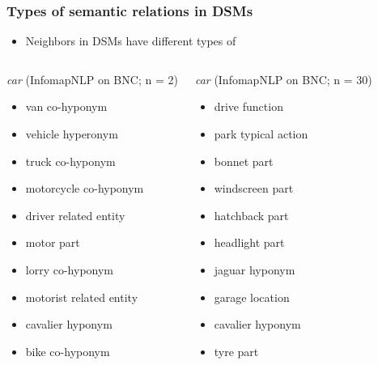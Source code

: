 \begin{frame}
\frametitle{Types of semantic relations in DSMs}

\begin{itemize}
\item Neighbors in DSMs have different types of
\end{itemize}

\ungap[1.5]\footnotesize
 \begin{columns}[t]
    \begin{block}{\emph{car} {\small (InfomapNLP on BNC; n = 2)}}
      \begin{itemize}
      \item  van {\color{counterpoint} co-hyponym}
      \item vehicle {\color{counterpoint} hyperonym}
      \item truck {\color{counterpoint} co-hyponym}
      \item motorcycle {\color{counterpoint} co-hyponym}
      \item driver {\color{counterpoint} related entity}
      \item motor {\color{counterpoint} part}
      \item lorry {\color{counterpoint} co-hyponym}
      \item motorist {\color{counterpoint} related entity}
      \item cavalier {\color{counterpoint} hyponym}
      \item bike {\color{counterpoint} co-hyponym}
\end{itemize}
\end{block}
\begin{block} {\emph{car} {\small (InfomapNLP on BNC; n = 30)}}
  \begin{itemize}
  \item drive {\color{counterpoint} function}
  \item park {\color{counterpoint} typical action}
  \item bonnet {\color{counterpoint} part}
  \item windscreen {\color{counterpoint} part}
  \item hatchback {\color{counterpoint} part}
\item headlight {\color{counterpoint} part}
\item jaguar {\color{counterpoint} hyponym}
\item garage {\color{counterpoint} location}
\item cavalier {\color{counterpoint} hyponym}
\item tyre {\color{counterpoint} part}
\end{itemize}
\end{block}
  \end{columns}

\end{frame}


